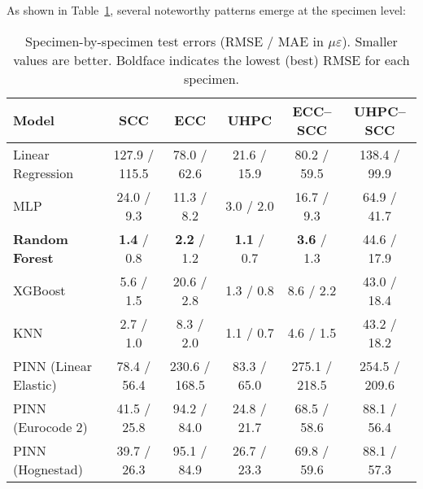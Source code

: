 \documentclass{article}
\begin{document}
As shown in Table~\ref{tab:specimen_errors}, several noteworthy patterns emerge at the specimen level:
\begin{table}[htbp]
\centering
\caption{Specimen-by-specimen test errors (RMSE / MAE in $\mu\varepsilon$). Smaller values are better. Boldface indicates the lowest (best) RMSE for each specimen.}
\label{tab:specimen_errors}
\begin{tabular}{lccccc}
\toprule
\textbf{Model} & \textbf{SCC} & \textbf{ECC} & \textbf{UHPC} & \textbf{ECC–SCC} & \textbf{UHPC–SCC}\\
\midrule
Linear Regression        & 127.9 / 115.5 &  78.0 / 62.6   &  21.6 / 15.9   &  80.2 / 59.5   & 138.4 / 99.9\\
MLP                      &  24.0 / 9.3   &  11.3 / 8.2    &   3.0 / 2.0    &  16.7 / 9.3    &  64.9 / 41.7\\
\textbf{Random Forest}   &  \textbf{1.4} / 0.8   &  \textbf{2.2} / 1.2    &  \textbf{1.1} / 0.7    &  \textbf{3.6} / 1.3    &  44.6 / 17.9\\
XGBoost                  &  5.6 / 1.5   & 20.6 / 2.8    &   1.3 / 0.8    &   8.6 / 2.2   &  43.0 / 18.4\\
KNN                      &  2.7 / 1.0   &  8.3 / 2.0    &   1.1 / 0.7    &   4.6 / 1.5   &  43.2 / 18.2\\
PINN (Linear Elastic)    &  78.4 / 56.4 & 230.6 / 168.5 &  83.3 / 65.0   & 275.1 / 218.5 & 254.5 / 209.6\\
PINN (Eurocode 2)        &  41.5 / 25.8 &  94.2 / 84.0  &  24.8 / 21.7   &  68.5 / 58.6  &  88.1 / 56.4\\
PINN (Hognestad)         &  39.7 / 26.3 &  95.1 / 84.9  &  26.7 / 23.3   &  69.8 / 59.6  &  88.1 / 57.3\\
\bottomrule
\end{tabular}
\end{table}
\end{document}
